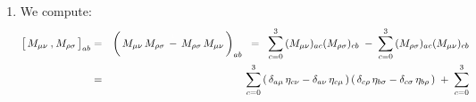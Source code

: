 \begin{enumerate}
	\vskip 0.3cm
	\noindent
	By Claim 1 and Claim 2, we see that:
	\begin{eqnarray*}
	\left[\,
		M_{\mu\nu}
		\,\overset{{\color{white}1}}{,}\,
		P_{\rho}
		\,\right]
	& = &
		\left[\begin{array}{cc}
			\mathbf{0}_{4 \times 4} & J_{\mu\nu}\,\mathbf{e}_{\rho}
			\\
			\mathbf{0}_{1 \times 4} & \mathbf{0}_{1 \times 1}
			\end{array}\right]
	\;\; = \;\;
		\left[\begin{array}{cc}
			\mathbf{0}_{4 \times 4}
			&
			- \eta_{\rho\mu}\,\mathbf{e}_{\nu} + \eta_{\rho\nu}\,\mathbf{e}_{\mu}
			\\
			\mathbf{0}_{1 \times 4} & \mathbf{0}_{1 \times 1}
			\end{array}\right]
	\\
	& = &
		-\,\eta_{\rho\mu}
		\left[\begin{array}{cc}
			\mathbf{0}_{4 \times 4} & \mathbf{e}_{\nu}
			\\
			\mathbf{0}_{1 \times 4} & \mathbf{0}_{1 \times 1}
			\end{array}\right]
		\; + \;
		\eta_{\rho\nu}
		\left[\begin{array}{cc}
			\mathbf{0}_{4 \times 4} & \mathbf{e}_{\mu}
			\\
			\mathbf{0}_{1 \times 4} & \mathbf{0}_{1 \times 1}
			\end{array}\right]
	\\
	& \overset{{\color{white}\textnormal{\large$1$}}}{=} &
		-\,\eta_{\rho\mu}\,P_{\nu}
		\, + \,
		\eta_{\rho\nu}\,P_{\mu}\,,
	\end{eqnarray*}
	as required.
\item
	We compute:
	\begin{eqnarray*}
	\left[\,
		M_{\mu\nu}
		\,\overset{{\color{white}1}}{,}\,
		M_{\rho\sigma}
		\,\right]_{ab}
	& = &
		\left(\,
			M_{\mu\nu}\,M_{\rho\sigma}
			\,\overset{{\color{white}1}}{-}\,
			M_{\rho\sigma}\,M_{\mu\nu}
			\,\right)_{ab}
	\;\; = \;\;
		\overset{3}{\underset{c=0}{\sum}}\,
		(M_{\mu\nu})_{ac}(M_{\rho\sigma})_{cb}
		\; - \;
		\overset{3}{\underset{c=0}{\sum}}\,
		(M_{\rho\sigma})_{ac}(M_{\mu\nu})_{cb}
	\\
	& = &
		\overset{3}{\underset{c=0}{\sum}}
		\left(\,%
			\delta_{a\mu}\,\eta_{c\nu}
			-
			\delta_{a\nu}\,\eta_{c\mu}
			\,\right)
		\left(\,%
			\delta_{c\rho}\,\eta_{b\sigma}
			-
			\delta_{c\sigma}\,\eta_{b\rho}
			\,\right)
		\;+\;
		\overset{3}{\underset{c=0}{\sum}}

\end{eqnarray*}
\end{enumerate}
